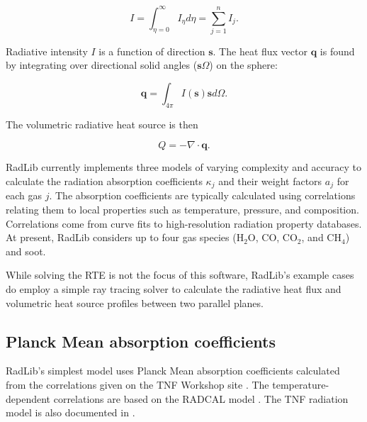 \documentclass[preprint,12pt]{elsarticle}
\newcounter{bla}
\begin{document}
%
\begin{linenomath}
\begin{equation}
	I=\int_{\eta=0}^{\infty}I_{\eta}d\eta=\sum_{j=1}^n I_j.
\end{equation}
\end{linenomath}
%
Radiative intensity $I$ is a function of direction $\mathbf{s}$. The heat flux vector $\mathbf{q}$ is found by integrating over directional solid angles ($\mathbf{s}\Omega$) on the sphere:
%
\begin{linenomath}
\begin{equation}
    \mathbf{q} = \int_{4\pi}I(\mathbf{s})\mathbf{s}d\Omega.
\end{equation}
\end{linenomath}
%
The volumetric radiative heat source is then 
%
\begin{linenomath}
\begin{equation}
    Q = -\nabla\cdot\mathbf{q}.
\end{equation}
\end{linenomath}
%

RadLib currently implements three models of varying complexity and accuracy to calculate the radiation absorption coefficients $\kappa_j$ and their weight factors $a_j$ for each gas $j$. The absorption coefficients are typically calculated using correlations relating them to local properties such as temperature, pressure, and composition. Correlations come from curve fits to high-resolution radiation property databases. At present, RadLib considers up to four gas species (H$_2$O, CO, CO$_2$, and CH$_4$) and soot. 

While solving the RTE is not the focus of this software, RadLib's example cases do employ a simple ray tracing solver to calculate the radiative heat flux and volumetric heat source profiles between two parallel planes. 



\subsection{Planck Mean absorption coefficients} \label{s:planckmean}

RadLib's simplest model uses Planck Mean absorption coefficients calculated from the correlations given on the TNF Workshop site \citep{Smith_2003}. The temperature-dependent correlations are based on the RADCAL model \citep{Grosshandler_1993}. The TNF radiation model is also documented in \citep{Barlow_2001}.
\end{document}
